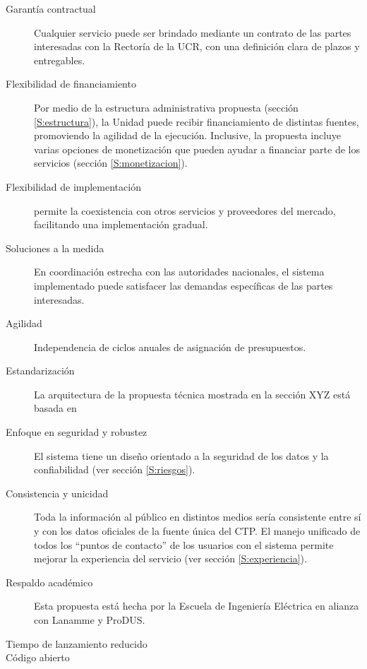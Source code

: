 \documentclass{report}
\begin{document}
\begin{description}
    \item[Garantía contractual] Cualquier servicio puede ser brindado mediante un contrato de las partes interesadas con la Rectoría de la UCR, con una definición clara de plazos y entregables.
    
    \item[Flexibilidad de financiamiento] Por medio de la estructura administrativa propuesta (sección \ref{S:estructura}), la Unidad puede recibir financiamiento de distintas fuentes, promoviendo la agilidad de la ejecución. Inclusive, la propuesta incluye varias opciones de monetización que pueden ayudar a financiar parte de los servicios (sección \ref{S:monetizacion}).

    \item[Flexibilidad de implementación] permite la coexistencia con otros servicios y proveedores del mercado, facilitando una implementación gradual.

    \item[Soluciones a la medida] En coordinación estrecha con las autoridades nacionales, el sistema implementado puede satisfacer las demandas específicas de las partes interesadas.

    \item[Agilidad] Independencia de ciclos anuales de asignación de presupuestos.

    \item[Estandarización] La arquitectura de la propuesta técnica mostrada en la sección XYZ está basada en

    \item[Enfoque en seguridad y robustez] El sistema tiene un diseño orientado a la seguridad de los datos y la confiabilidad (ver sección \ref{S:riesgos}).

    \item[Consistencia y unicidad] Toda la información al público en distintos medios sería consistente entre sí y con los datos oficiales de la fuente única del CTP. El manejo unificado de todos los ``puntos de contacto'' de los usuarios con el sistema permite mejorar la experiencia del servicio (ver sección \ref{S:experiencia}).

    \item[Respaldo académico] Esta propuesta está hecha por la Escuela de Ingeniería Eléctrica en alianza con Lanamme y ProDUS.

    \item[Tiempo de lanzamiento reducido] 

    \item[Código abierto] 
    
\end{description}
\end{document}
